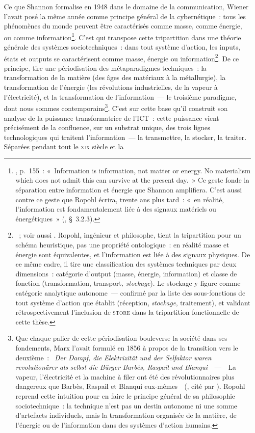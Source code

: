 Ce que Shannon formalise en 1948 dans le domaine de la communication, Wiener l'avait posé la même année comme principe général de la cybernétique~: tous les phénomènes du monde peuvent être caractérisés comme masse, comme énergie, ou comme information\footnote{\textcite{wiener_cybernetics_1948}, p.~155~: «~Information is information, not matter or energy. No materialism which does not admit this can survive at the present day.~» Ce geste fonde la séparation entre information et énergie que Shannon amplifiera. C'est aussi contre ce geste que Ropohl écrira, trente ans plus tard~: «~en réalité, l'information est fondamentalement liée à des signaux matériels ou énergétiques~» (\textcite{ropohl_systemtheorie_1979}, §~3.2.3).}. C'est \textcite{ropohl_systemtheorie_1979} qui transpose cette tripartition dans une théorie générale des systèmes sociotechniques~: dans tout système d'action, les inputs, états et outputs se caractérisent comme masse, énergie ou information\footnote{\textcite{ropohl_systemtheorie_1979}~; voir aussi \textcite{ropohl_philosophy_1999}. Ropohl, ingénieur et philosophe, tient la tripartition pour un schéma heuristique, pas une propriété ontologique~: en réalité masse et énergie sont équivalentes, et l'information est liée à des signaux physiques. De ce même cadre, il tire une classification des systèmes techniques par deux dimensions~: catégorie d'output (masse, énergie, information) et classe de fonction (transformation, transport, \emph{stockage}). Le stockage y figure comme catégorie analytique autonome~--- confirmé par la liste des sous-fonctions de tout système d'action que \textcite{miller_living_1978} établit (réception, \emph{stockage}, traitement), et validant rétrospectivement l'inclusion de \textsc{store} dans la tripartition fonctionnelle de cette thèse.}. De ce principe, \textcite{hilty_ict4s_2012} tire une périodisation des métaparadigmes techniques~: la transformation de la matière (des âges des matériaux à la métallurgie), la transformation de l'énergie (les révolutions industrielles, de la vapeur à l'électricité), et la transformation de l'information~--- le troisième paradigme, dont nous sommes contemporains\footnote{Que chaque palier de cette périodisation bouleverse la société dans ses fondements, Marx l'avait formulé en 1856 à propos de la transition vers le deuxième~: \og~\emph{Der Dampf, die Elektrizität und der Selfaktor waren revolutionärer als selbst die Bürger Barb\`es, Raspail und Blanqui}~\fg~---~\og~La vapeur, l'électricité et la machine à filer ont été des révolutionnaires plus dangereux que Barb\`es, Raspail et Blanqui eux-mêmes~\fg~(\textcite{marx_speech_1856}, cité par \textcite{ropohl_philosophy_1999}). Ropohl reprend cette intuition pour en faire le principe général de sa philosophie sociotechnique~: la technique n'est pas un destin autonome ni une somme d'artefacts individuels, mais la transformation organisée de la matière, de l'énergie ou de l'information dans des systèmes d'action humains.}. C'est sur cette base qu'il construit son analyse de la puissance transformatrice de l'ICT~: cette puissance vient précisément de la confluence, sur un substrat unique, des trois lignes technologiques qui traitent l'information~--- la transmettre, la stocker, la traiter. Séparées pendant tout le \textsc{xix}\ieme{} siècle et la 